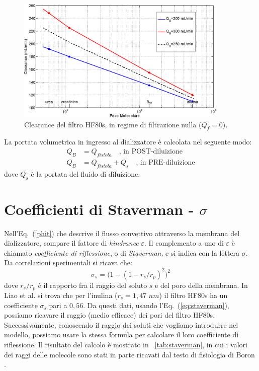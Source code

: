 \begin{figure}[htb]
	\centering
		\includegraphics[width=0.9\textwidth]{immagini/interp_log.eps}
		\caption{Clearance del filtro HF80s, in regime di filtrazione nulla ($Q_f=0$).}
		\label{fig:doppia_interp}
\end{figure}
La portata volumetrica in ingresso al dializzatore è calcolata nel seguente modo:
\begin{align*}
	Q_B &= Q_{fistola} \quad\text{, in POST-diluizione}\\
	Q_B &= Q_{fistola} + Q_s \quad\text{, in PRE-diluizione}
\end{align*}
dove $Q_s$ è la portata del fluido di diluizione.

\section{Coefficienti di Staverman - $\sigma$}
Nell'Eq.~(\ref{phit}) che descrive il flusso convettivo attraverso la membrana del dializzatore, compare il fattore di \textit{hindrance} $\varepsilon$. Il complemento a uno di $\varepsilon$ è chiamato \textit{coefficiente di riflessione}, o di \textit{Staverman}, e si indica con la lettera $\sigma$. Da correlazioni sperimentali \cite{Liao} si ricava che:
\begin{equation}
	\sigma _s = \bigl(1-(1-r_s/r_p)^2\bigr)^2
	\label{eq:staverman}
\end{equation}
dove $r_s/r_p$ è il rapporto fra il raggio del soluto $s$ e del poro della membrana.
In Liao et al. \cite{Liao} si trova che per l'inulina ($r_s=1,47$ $nm$) il filtro HF80s ha un coefficiente $\sigma _s$ pari a $0,56$. Da questi dati, usando l'Eq.~(\ref{eq:staverman}), possiamo ricavare il raggio (medio efficace) dei pori del filtro HF80s. Successivamente, conoscendo il raggio dei soluti che vogliamo introdurre nel modello, possiamo usare la stessa formula per calcolare il loro coefficiente di riflessione. Il risultato del calcolo è mostrato in \tablename~\ref{tab:staverman}, in cui i valori dei raggi delle molecole sono stati in parte ricavati dal testo di fisiologia di Boron \cite{boron}.

